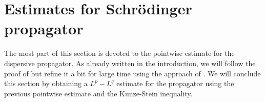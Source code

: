\documentclass[10pt,leqno]{amsart}
\numberwithin{equation}{section}
\begin{document}
\section{Estimates for Schr\"odinger propagator}\label{secpropa}

The most part of this section is devoted to the pointwise estimate for the dispersive propagator. As already written in the introduction, we will follow the proof of \cite{IS2009} but refine it a bit for large time using the approach of \cite{AMPVZ}. We will conclude this section by obtaining a $L^p-L^q$ estimate for the propagator using the previous pointwise estimate and the Kunze-Stein inequality.\\
\end{document}
